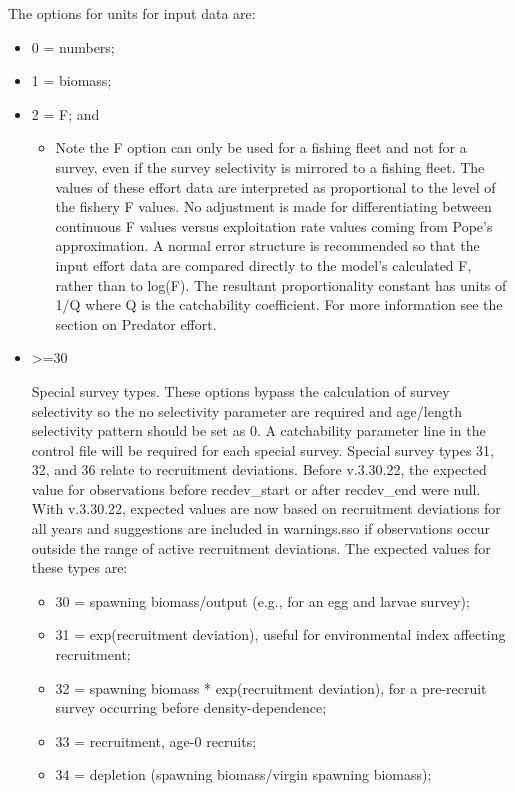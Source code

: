 \hypertarget{IndexUnits}{}
The options for units for input data are:	
	\begin{itemize}
		\item 0  = numbers;
		\item 1  = biomass; 
		\item 2  = F; and
		\begin{itemize}
			\item Note the F option can only be used for a fishing fleet and not for a survey, even if the survey selectivity is mirrored to a fishing fleet. The values of these effort data are interpreted as proportional to the level of the fishery F values. No adjustment is made for differentiating between continuous F values versus exploitation rate values coming from Pope's approximation. A normal error structure is recommended so that the input effort data are compared directly to the model's calculated F, rather than to log(F). The resultant proportionality constant has units of 1/Q where Q is the catchability coefficient. For more information see the section on \hypertarget{PredEffort}{Predator effort}.	
		\end{itemize}
		\item \hypertarget{SpecialSurvey}{>=30} Special survey types. These options bypass the calculation of survey selectivity so the no selectivity parameter are required and age/length selectivity pattern should be set as 0. A catchability parameter line in the control file will be required for each special survey. Special survey types 31, 32, and 36 relate to recruitment deviations. Before v.3.30.22, the expected value for observations before recdev\_start or after recdev\_end were null. With v.3.30.22, expected values are now based on recruitment deviations for all years and suggestions are included in warnings.sso if observations occur outside the range of active recruitment deviations. The expected values for these types are:
		\begin{itemize}
			\item 30 = spawning biomass/output (e.g., for an egg and larvae survey);
			\item 31 = exp(recruitment deviation), useful for environmental index affecting recruitment;
			\item 32 = spawning biomass * exp(recruitment deviation), for a pre-recruit survey occurring before density-dependence;
			\item 33 = recruitment, age-0 recruits;
			\item 34 = depletion (spawning biomass/virgin spawning biomass);

\end{itemize}
\end{itemize}
